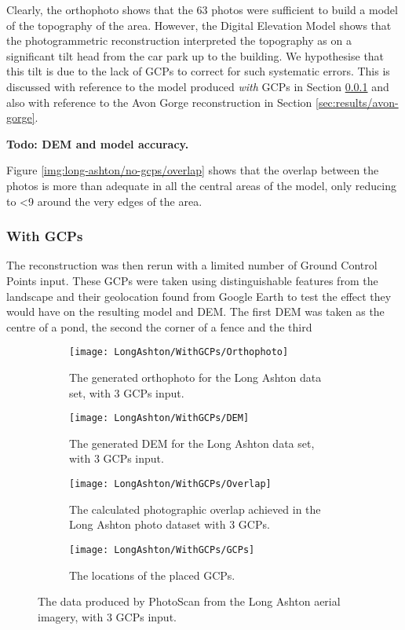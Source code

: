 Clearly, the orthophoto shows that the 63 photos were sufficient to build a
model of the topography of the area. However, the Digital Elevation Model shows
that the photogrammetric reconstruction interpreted the topography as on a
significant tilt head from the car park up to the building. We hypothesise that
this tilt is due to the lack of GCPs to correct for such systematic errors. This
is discussed with reference to the model produced \textit{with} GCPs in Section
\ref{sec:results/long-ashton/wth-gcps} and also with reference to the Avon Gorge
reconstruction in Section \ref{sec:results/avon-gorge}.

\textbf{Todo: DEM and model accuracy.}

Figure \ref{img:long-ashton/no-gcps/overlap} shows that the overlap between the
photos is more than adequate in all the central areas of the model, only
reducing to \textless 9 around the very edges of the area.

\subsubsection{With GCPs}
\label{sec:results/long-ashton/wth-gcps}

The reconstruction was then rerun with a limited number of Ground Control Points
input. These GCPs were taken using distinguishable features from the landscape
and their geolocation found from Google Earth to test the effect they would have
on the resulting model and DEM. The first DEM was taken as the centre of a pond,
the second the corner of a fence and the third

\begin{figure}
    \centering
    \begin{subfigure}[b]{0.45\textwidth}
        \texttt{[image: LongAshton/WithGCPs/Orthophoto]}
        \caption{The generated orthophoto for the Long Ashton data set, with 3
        GCPs input.}
        \label{img:long-ashton/with-gcps/orthophoto}
    \end{subfigure}
    \begin{subfigure}[b]{0.45\textwidth}
        \texttt{[image: LongAshton/WithGCPs/DEM]}
        \caption{The generated DEM for the Long Ashton data set, with 3 GCPs
        input.}
        \label{img:long-ashton/with-gcps/dem}
    \end{subfigure}
    \begin{subfigure}[b]{0.45\textwidth}
        \texttt{[image: LongAshton/WithGCPs/Overlap]}
        \caption{The calculated photographic overlap achieved in the Long Ashton
        photo dataset with 3 GCPs.}
        \label{img:long-ashton/with-gcps/overlap}
    \end{subfigure}
    \begin{subfigure}[b]{0.45\textwidth}
        \texttt{[image: LongAshton/WithGCPs/GCPs]}
        \caption{The locations of the placed GCPs.}
        \label{img:long-ashton/with-gcps/gcps}
    \end{subfigure}
    \caption{The data produced by PhotoScan from the Long Ashton aerial imagery,
    with 3 GCPs input.}
    \label{img:long-ashton/with-gcps}
\end{figure}

